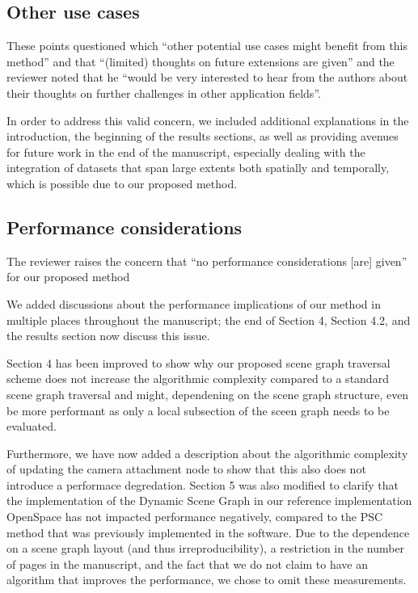 \documentclass{article}
\begin{document}
\vspace*{1cm}

\begin{tcolorbox}
\subsection{Other use cases}\label{concern:applications} These points questioned which ``other potential use cases might benefit from this method'' and that ``(limited) thoughts on future extensions are given'' and the reviewer noted that he ``would be very interested to hear from the authors about their thoughts on further challenges in other application fields''.
\end{tcolorbox}
In order to address this valid concern, we included additional explanations in the
introduction, the beginning of the results sections, as well as providing avenues for
future work in the end of the manuscript, especially dealing with the integration of datasets that span large extents both spatially and temporally, which is possible due to our proposed method.

\vspace*{1cm}

\begin{tcolorbox}
\subsection{Performance considerations}\label{concern:performance}
The reviewer raises the concern that ``no performance considerations [are] given'' for our proposed method
\end{tcolorbox}
We added discussions about the performance implications of our method in multiple places throughout the manuscript; the end of Section 4, Section 4.2, and the results section now discuss this issue.

Section 4 has been improved to show why our proposed scene graph traversal scheme does not increase the algorithmic complexity compared to a standard scene graph traversal and might, dependening on the scene graph structure, even be more performant as only a local subsection of the sceen graph needs to be evaluated.

Furthermore, we have now added a description about the algorithmic complexity of updating the camera attachment node to show that this also does not introduce a performace degredation.
Section 5 was also modified to clarify that the implementation of the Dynamic Scene Graph in our reference implementation OpenSpace has not impacted performance negatively, compared to the PSC method that was previously implemented in the software.
Due to the dependence on a scene graph layout (and thus irreproducibility), a restriction in the number of pages in the manuscript, and the fact that we do not claim to have an algorithm that improves the performance, we chose to omit these measurements.
\end{document}
